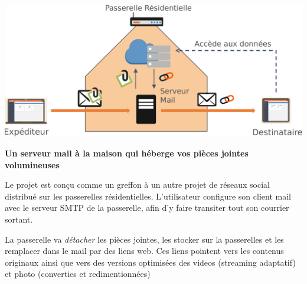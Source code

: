 \documentclass[portrait,final,a0paper]{baposter}
\begin{document}
\begin{poster}
{   \begin{multicols}{2}
			\begin{minipage}{0.5\textwidth}
				\includegraphics[width=\textwidth]{snapmail}
				\begin{center}\textbf{Un serveur mail à la maison qui héberge vos pièces jointes volumineuses}
				\vspace{2em}
				\end{center}
			\end{minipage}
			Le projet est conçu comme un greffon à un autre projet de réseaux social distribué sur les passerelles résidentielles.
			L'utilisateur configure son client mail avec le serveur SMTP de la passerelle, afin d'y faire transiter tout son courrier sortant. 
			
			La passerelle va \textit{détacher} les pièces jointes, les stocker sur la passerelles et les remplacer dans le mail par des liens web. Ces liens pointent vers les contenus originaux ainsi que vers des versions optimisées des videos (streaming adaptatif) et photo (converties et redimentionnées)
	\end{multicols}
    }
 
\end{poster}
\end{document}
